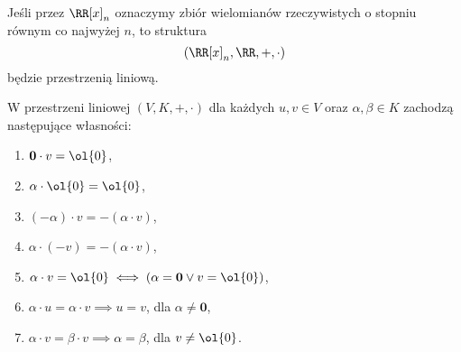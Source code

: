 \begin{example}
    Jeśli przez $\RR[x]_n$ oznaczymy zbiór wielomianów rzeczywistych o stopniu równym co najwyżej $n$, to struktura \[(\RR[x]_n, \RR, +, \cdot)\]
    będzie przestrzenią liniową.
\end{example}

\begin{theorem}
    W przestrzeni liniowej $(V, K, +, \cdot)$ dla każdych $u, v \in V$ oraz $\alpha, \beta \in K$ zachodzą następujące własności:
    \begin{enumerate}
        \item $\mathbf{0} \cdot v = \ol{0}$,
        \item $\alpha \cdot \ol{0} = \ol{0}$,
        \item $(-\alpha) \cdot v = - (\alpha \cdot v)$,
        \item $\alpha \cdot (-v) = - (\alpha \cdot v)$,
        \item $\alpha \cdot v = \ol{0} \iff (\alpha = \mathbf{0} \lor v = \ol{0})$,
        \item $\alpha \cdot u = \alpha \cdot v \implies u = v$, dla $\alpha \neq \mathbf{0}$,
        \item $\alpha \cdot v = \beta \cdot v \implies \alpha = \beta$, dla $v \neq \ol{0}$.
    \end{enumerate}
\end{theorem}

